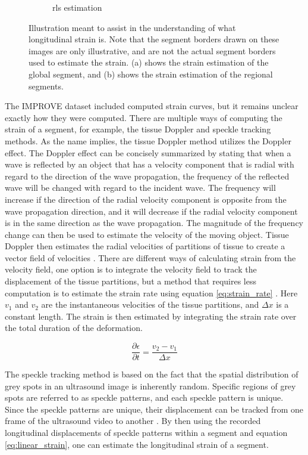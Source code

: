 \begin{figure}[H]
\begin{subfigure}[b]{0.49\textwidth}
        \caption{\acrshort{rls} estimation}
        \label{fig:rls_estimation}
    \end{subfigure}
    \caption{Illustration meant to assist in the understanding of what longitudinal strain is. Note that the segment borders drawn on these images are only illustrative, and are not the actual segment borders used to estimate the strain. (a) shows the strain estimation of the global segment, and (b) shows the strain estimation of the regional segments.}
    \label{fig:strain_estimation}
\end{figure}

The IMPROVE dataset included computed strain curves, but it remains unclear exactly how they were computed. There are multiple ways of computing the strain of a segment, for example, the tissue Doppler and speckle tracking methods. As the name implies, the tissue Doppler method utilizes the Doppler effect. The Doppler effect can be concisely summarized by stating that when a wave is reflected by an object that has a velocity component that is radial with regard to the direction of the wave propagation, the frequency of the reflected wave will be changed with regard to the incident wave. The frequency will increase if the direction of the radial velocity component is opposite from the wave propagation direction, and it will decrease if the radial velocity component is in the same direction as the wave propagation. The magnitude of the frequency change can then be used to estimate the velocity of the moving object. Tissue Doppler then estimates the radial velocities of partitions of tissue to create a vector field of velocities \cite{strain_rate_imaging}. There are different ways of calculating strain from the velocity field, one option is to integrate the velocity field to track the displacement of the tissue partitions, but a method that requires less computation is to estimate the strain rate using equation \eqref{eq:strain_rate} \cite{myocardial_imaging}. Here $v_1$ and $v_2$ are the instantaneous velocities of the tissue partitions, and $\Delta x$ is a constant length. The strain is then estimated by integrating the strain rate over the total duration of the deformation. 

\begin{equation}
    \frac{\partial \epsilon}{\partial t} = \frac{v_2 - v_1}{\Delta x}
    \label{eq:strain_rate}
\end{equation}

The speckle tracking method is based on the fact that the spatial distribution of grey spots in an ultrasound image is inherently random. Specific regions of grey spots are referred to as speckle patterns, and each speckle pattern is unique. Since the speckle patterns are unique, their displacement can be tracked from one frame of the ultrasound video to another \cite{myocardial_imaging}. By then using the recorded longitudinal displacements of speckle patterns within a segment and equation \eqref{eq:linear_strain}, one can estimate the longitudinal strain of a segment.

